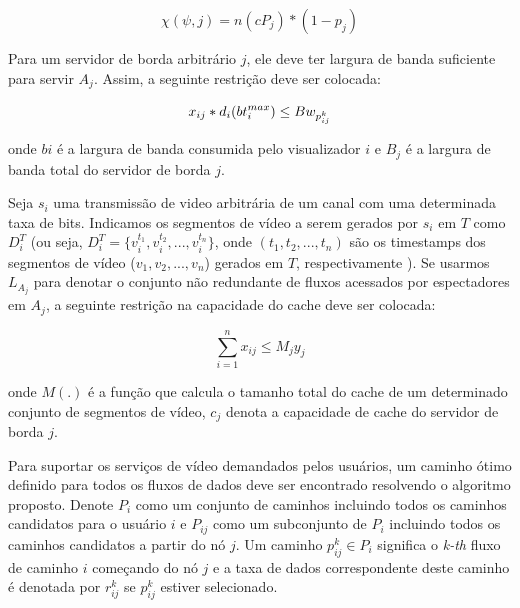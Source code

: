\begin{equation}\label{cost_func}
\chi(\psi, j) = n(cP_{j}) * (1 - p_{j})
\end{equation}
\vspace{.05cm}

Para um servidor de borda arbitrário $j$, ele deve ter largura de banda suficiente para servir $A_j$. Assim, a seguinte restrição deve ser colocada:

\begin{equation}
x_{ij} * d_{i}( bt_{i}^{max}) \leq Bw_{p_{ij}^{k}} \\
\end{equation}
\vspace{.05cm}

onde $bi$ é a largura de banda consumida pelo visualizador $i$ e $B_j$ é a largura de banda total do servidor de borda $j$.

Seja $s_i$ uma transmissão de video arbitrária de um canal com uma determinada taxa de bits. Indicamos os segmentos de vídeo a serem gerados por $s_i$ em $T$ como $D^T_i$ (ou seja, $D^T_i = \{ v^{t_1}_i, v^{t_2}_i, ..., v ^{t_n}_i \}$, onde $(t_1,t_2,...,t_n)$ são os timestamps dos segmentos de vídeo ($v_1,v_2, ..., v_n$) gerados em $T$, respectivamente ). Se usarmos $L_{A_j}$ para denotar o conjunto não redundante de fluxos acessados por espectadores em $A_j$, a seguinte restrição na capacidade do cache deve ser colocada:

\begin{equation}
\sum^{n}_{i=1} x_{ij} \leq M_{j}y_{j}
\end{equation}
\vspace{.05cm}

onde $M(.)$ é a função que calcula o tamanho total do cache de um determinado conjunto de segmentos de vídeo, $c_j$ denota a capacidade de cache do servidor de borda $j$.

Para suportar os serviços de vídeo demandados pelos usuários, um caminho ótimo definido para todos os fluxos de dados deve ser encontrado resolvendo o algoritmo proposto. Denote $P_{i}$ como um conjunto de caminhos incluindo todos os caminhos candidatos para o usuário $i$ e $P_{ij}$ como um subconjunto de $P_{i}$ incluindo todos os caminhos candidatos a partir do nó $j$. Um caminho $p_{ij}^{k} \in P_{i}$ significa o \textit{k-th} fluxo de caminho $i$ começando do nó $j$ e a taxa de dados correspondente deste caminho é denotada por $r_{ ij}^{k}$ se $p_{ij}^{k}$ estiver selecionado.

